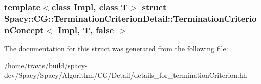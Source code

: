 \subsubsection*{template$<$class Impl, class T$>$ struct Spacy\-::\-C\-G\-::\-Termination\-Criterion\-Detail\-::\-Termination\-Criterion\-Concept$<$ Impl, T, false $>$}



\-The documentation for this struct was generated from the following file\-:\begin{DoxyCompactItemize}
\item 
/home/travis/build/spacy-\/dev/\-Spacy/\-Spacy/\-Algorithm/\-C\-G/\-Detail/details\-\_\-for\-\_\-termination\-Criterion.\-hh\end{DoxyCompactItemize}
